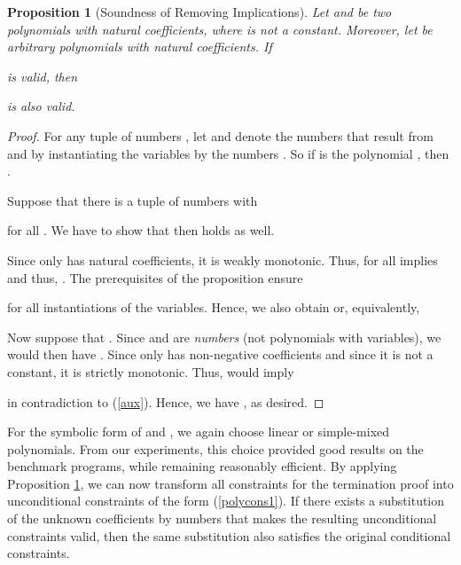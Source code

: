 \documentclass[envcountsame]{tlp}
\newcounter{polycons2ctr}
\newcounter{polycons1ctr}
\newcounter{ex:der-lastsymconsctr}
\newtheorem{proposition}{Proposition}
\begin{document}
\begin{proposition}[Soundness of Removing Implications]\label{Soundness of First Phase of the Transformation} 
Let  and  be two polynomials with
natural coefficients, where  is not a constant.
Moreover, let  be
arbitrary polynomials with  natural coefficients.
If

is valid, then

is also valid.
\end{proposition}
\begin{proof}
For any tuple of
numbers , let
 and 
denote the numbers that result from  and  by instantiating the
variables  by the numbers . So if  is the
polynomial ,
then . 

Suppose that there is a tuple of numbers 
 with

for all . We have to show that then
 holds as well.

Since  only has natural coefficients, it is weakly monotonic.
Thus,
 for all 
implies
 and thus,
.
The prerequisites of the proposition ensure 

for all instantiations of the variables. Hence, we also obtain
\linebreak
 or, equivalently,

Now suppose that . Since 
 and  are \emph{numbers} (not
polynomials with variables), we would then have . Since 
  only has non-negative coefficients and since it is not a
constant, it is strictly monotonic. Thus,   would imply 

in contradiction to (\ref{aux}). Hence, we have , as desired. 

\end{proof}

For the symbolic form of  and
, we again choose linear
or simple-mixed  polynomials. 
From our experiments, this choice
provided good results on the benchmark programs, while remaining reasonably 
efficient. 
By applying Proposition \ref{Soundness of First Phase of the Transformation},
we can now transform all constraints for the termination proof into unconditional constraints
of the form (\ref{polycons1}). If there exists a substitution of the unknown
coefficients by numbers that makes the resulting unconditional constraints valid,
then the same substitution also satisfies the original conditional constraints.
\end{document}

